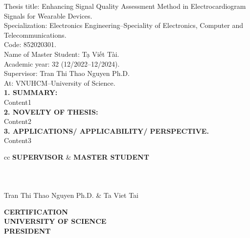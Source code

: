 \begin{flushleft}
	Thesis title: Enhancing Signal Quality Assessment Method in Electrocardiogram Signals for Wearable Devices. \\
	Specialization: Electronics Engineering--Speciality of Electronics, Computer and Telecommunications. \\
	Code: 852020301. \\
	Name of Master Student: Tạ Viết Tài. \\
	Academic year: 32 (12/2022--12/2024). \\
	Supervisor: Tran Thi Thao Nguyen Ph.D.\\
	At: VNUHCM--University of Science.\\
	\vspace{1.5em}
	\textbf{1. SUMMARY:}\\
	Content1 \\
	\textbf{2. NOVELTY OF THESIS:}\\
	Content2 \\
	\textbf{3. APPLICATIONS/ APPLICABILITY/ PERSPECTIVE.}\\
	Content3 \\
\end{flushleft}


\vspace{1.5em}
\begin{tblr}{cc}
	\centering
	\textbf{SUPERVISOR}        & \textbf{\hspace{6.0em}MASTER STUDENT} \\
	\\
	\\
	\\
	Tran Thi Thao Nguyen Ph.D. & \hspace{6.0em} Ta Viet Tai
\end{tblr}

\vspace{2.5em}
\begin{center}
	\textbf{CERTIFICATION}\\
	\textbf{UNIVERSITY OF SCIENCE} \\
	\textbf{PRESIDENT}
\end{center}